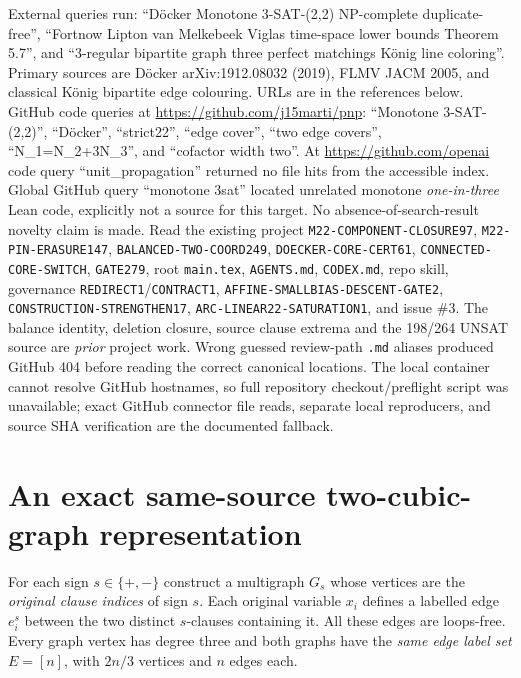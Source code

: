 \documentclass[11pt]{article}
\begin{document}
\noindent External queries run: ``D\"ocker Monotone 3-SAT-(2,2) NP-complete duplicate-free'', ``Fortnow Lipton van Melkebeek Viglas time-space lower bounds Theorem 5.7'', and ``3-regular bipartite graph three perfect matchings K\"onig line coloring''. Primary sources are D\"ocker arXiv:1912.08032 (2019), FLMV JACM 2005, and classical K\"onig bipartite edge colouring. URLs are in the references below. GitHub code queries at \url{https://github.com/j15marti/pnp}: ``Monotone 3-SAT-(2,2)'', ``D\"ocker'', ``strict22'', ``edge cover'', ``two edge covers'', ``N_1=N_2+3N_3'', and ``cofactor width two''. At \url{https://github.com/openai} code query ``unit_propagation'' returned no file hits from the accessible index. Global GitHub query ``monotone 3sat'' located unrelated monotone \emph{one-in-three} Lean code, explicitly not a source for this target. No absence-of-search-result novelty claim is made. Read the existing project \texttt{M22-COMPONENT-CLOSURE97}, \texttt{M22-PIN-ERASURE147}, \texttt{BALANCED-TWO-COORD249}, \texttt{DOECKER-CORE-CERT61}, \texttt{CONNECTED-CORE-SWITCH}, \texttt{GATE279}, root \texttt{main.tex}, \texttt{AGENTS.md}, \texttt{CODEX.md}, repo skill, governance \texttt{REDIRECT1}/\texttt{CONTRACT1}, \texttt{AFFINE-SMALLBIAS-DESCENT-GATE2}, \texttt{CONSTRUCTION-STRENGTHEN17}, \texttt{ARC-LINEAR22-SATURATION1}, and issue \#3. The balance identity, deletion closure, source clause extrema and the 198/264 UNSAT source are \emph{prior} project work. Wrong guessed review-path \texttt{.md} aliases produced GitHub 404 before reading the correct canonical locations. The local container cannot resolve GitHub hostnames, so full repository checkout/preflight script was unavailable; exact GitHub connector file reads, separate local reproducers, and source SHA verification are the documented fallback.

\section{An exact same-source two-cubic-graph representation}
For each sign $s\in\{+,-\}$ construct a multigraph $G_s$ whose vertices are the \emph{original clause indices} of sign $s$. Each original variable $x_i$ defines a labelled edge $e_i^s$ between the two distinct $s$-clauses containing it. All these edges are loops-free. Every graph vertex has degree three and both graphs have the \emph{same edge label set} $E=[n]$, with $2n/3$ vertices and $n$ edges each.
\end{document}
